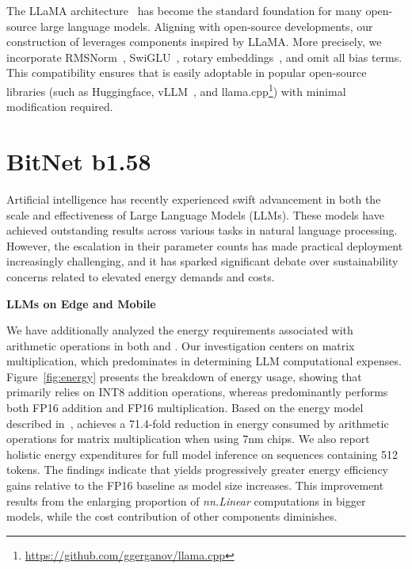 The LLaMA architecture~\cite{llama, llama2} has become the standard foundation for many open-source large language models. Aligning with open-source developments, our construction of  leverages components inspired by LLaMA. More precisely, we incorporate RMSNorm~\cite{rmsnorm}, SwiGLU~\cite{swiglu}, rotary embeddings~\cite{rope}, and omit all bias terms. This compatibility ensures that  is easily adoptable in popular open-source libraries (such as Huggingface, vLLM~\cite{vllm}, and llama.cpp\footnote{\url{https://github.com/ggerganov/llama.cpp}}) with minimal modification required.

\section{BitNet b1.58}

Artificial intelligence has recently experienced swift advancement in both the scale and effectiveness of Large Language Models (LLMs). These models have achieved outstanding results across various tasks in natural language processing. However, the escalation in their parameter counts has made practical deployment increasingly challenging, and it has sparked significant debate over sustainability concerns related to elevated energy demands and costs.

\textbf{LLMs on Edge and Mobile}

We have additionally analyzed the energy requirements associated with arithmetic operations in both  and . Our investigation centers on matrix multiplication, which predominates in determining LLM computational expenses. Figure~\ref{fig:energy} presents the breakdown of energy usage, showing that  primarily relies on INT8 addition operations, whereas  predominantly performs both FP16 addition and FP16 multiplication. Based on the energy model described in~\cite{energycost, pokebnn},  achieves a 71.4-fold reduction in energy consumed by arithmetic operations for matrix multiplication when using 7nm chips. We also report holistic energy expenditures for full model inference on sequences containing 512 tokens. The findings indicate that  yields progressively greater energy efficiency gains relative to the FP16  baseline as model size increases. This improvement results from the enlarging proportion of \emph{nn.Linear} computations in bigger models, while the cost contribution of other components diminishes.

